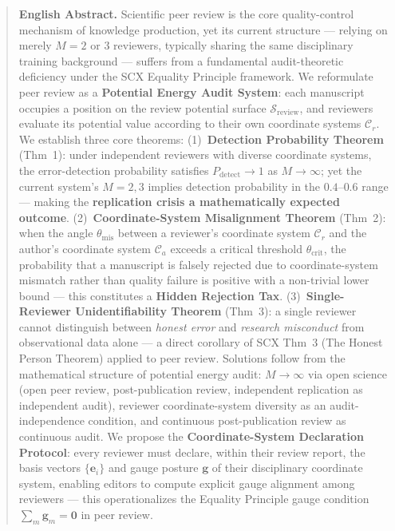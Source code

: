 \documentclass[12pt,a4paper]{article}
\theoremstyle{remark}
\newcommand{\sumgd}{\sum_m \mathbf{g}_m = \mathbf{0}}
\newcommand{\reviewSurf}{\mathcal{S}_{\text{review}}}
\newcommand{\coordSys}{\mathcal{C}}
\newcommand{\gaugeVec}{\mathbf{g}}
\newcommand{\misalignAngle}{\theta_{\text{mis}}}
\newcommand{\threshCrit}{\theta_{\text{crit}}}
\newcommand{\detectProb}{P_{\text{detect}}}
\begin{document}
\begin{abstract}
\medskip
\noindent\textbf{English Abstract.}
Scientific peer review is the core quality-control mechanism of knowledge production, yet its current structure — relying on merely $M=2$ or $3$ reviewers, typically sharing the same disciplinary training background — suffers from a fundamental audit-theoretic deficiency under the SCX Equality Principle framework. We reformulate peer review as a \textbf{Potential Energy Audit System}: each manuscript occupies a position on the review potential surface $\reviewSurf$, and reviewers evaluate its potential value according to their own coordinate systems $\coordSys_r$. We establish three core theorems: (1)~\textbf{Detection Probability Theorem} (Thm~1): under independent reviewers with diverse coordinate systems, the error-detection probability satisfies $\detectProb \to 1$ as $M \to \infty$; yet the current system's $M=2,3$ implies detection probability in the $0.4$--$0.6$ range — making the \textbf{replication crisis a mathematically expected outcome}. (2)~\textbf{Coordinate-System Misalignment Theorem} (Thm~2): when the angle $\misalignAngle$ between a reviewer's coordinate system $\coordSys_r$ and the author's coordinate system $\coordSys_a$ exceeds a critical threshold $\threshCrit$, the probability that a manuscript is falsely rejected due to coordinate-system mismatch rather than quality failure is positive with a non-trivial lower bound — this constitutes a \textbf{Hidden Rejection Tax}. (3)~\textbf{Single-Reviewer Unidentifiability Theorem} (Thm~3): a single reviewer cannot distinguish between \textit{honest error} and \textit{research misconduct} from observational data alone — a direct corollary of SCX Thm~3 (The Honest Person Theorem) applied to peer review. Solutions follow from the mathematical structure of potential energy audit: $M \to \infty$ via open science (open peer review, post-publication review, independent replication as independent audit), reviewer coordinate-system diversity as an audit-independence condition, and continuous post-publication review as continuous audit. We propose the \textbf{Coordinate-System Declaration Protocol}: every reviewer must declare, within their review report, the basis vectors $\{\mathbf{e}_i\}$ and gauge posture $\gaugeVec$ of their disciplinary coordinate system, enabling editors to compute explicit gauge alignment among reviewers — this operationalizes the Equality Principle gauge condition $\sumgd$ in peer review.

\end{abstract}

\newpage
\end{document}
